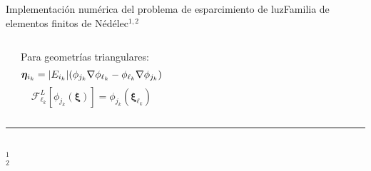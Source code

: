 \begin{frame}{Implementación numérica del problema de esparcimiento de luz}{Familia de elementos finitos de Nédélec$^{1,2}$}
\begin{columns}
\begin{center}
    \end{center}   

\centering
Para geometrías triangulares:
$$\boldsymbol{\eta}_{i_k} = \abs{E_{i_k}} \qty(\phi_{j_k}\nabla\phi_{\ell_k} - \phi_{\ell_k}\nabla\phi_{j_k} )$$
$$\mathcal{F}^{L}_{\ell_k}[\phi_{j_k}(\boldsymbol{\xi})] = \phi_{j_k}(\boldsymbol{\xi}_{\ell_k})$$
\begin{figure}
    \fontsize{4}{5} \selectfont
    \def\svgwidth{1\textwidth}
\end{figure}


\end{columns}
    \vspace*{-.0em}\fontsize{4}{5} \selectfont
   \noindent\rule{.25\textwidth}{0.4pt}\\
	$^1$ \\
	$^2$ 
\end{frame}

